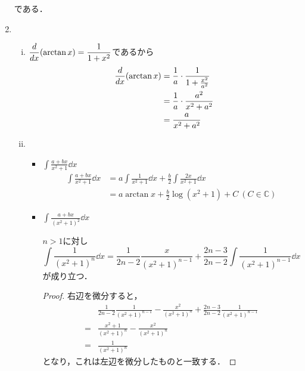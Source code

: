 \begin{enumerate}[(1)]
    である．
    \item 
    \begin{enumerate}[(i)]
        \item $\displaystyle \dv{x}(\arctan x)=\dfrac{1}{1+x^2}$であるから
        \begin{align}
            \dv{x}(\arctan x)
            &=\frac{1}{a}\cdot\frac{1}{1+\frac{x^2}{a^2}}\\
            &=\frac{1}{a}\cdot\frac{a^2}{x^2+a^2}\\
            &=\frac{a}{x^2+a^2}
        \end{align}
        \item \ 
        \begin{itemize}
            \item $\displaystyle \int \frac{a+bx}{x^2+1}\dd{x}$
            \begin{align}
                \int \frac{a+bx}{x^2+1}\dd{x}
                &=a\int\frac{1}{x^2+1}\dd{x}+\frac{b}{2}\int\frac{2x}{x^2+1}\dd{x}\\
                &=a\arctan{x}+\frac{b}{2}\log(x^2+1)+C\ (C\in \mathbb{C})
            \end{align}
            \item $\displaystyle \int \frac{a+bx}{(x^2+1)^2}\dd{x}$
            \begin{lemma}
                $n>1$に対し
                \begin{equation}
                    \int \frac{1}{(x^2+1)^n}\dd{x}=
                    \frac{1}{2n-2}\frac{x}{(x^2+1)^{n-1}}+
                    \frac{2n-3}{2n-2}\int \frac{1}{(x^2+1)^{n-1}}\dd{x}
                \end{equation}
                が成り立つ．
            \end{lemma}
            \begin{proof}
                右辺を微分すると，
                \begin{align}
                    &
                    \frac{1}{2n-2}\frac{1}{(x^2+1)^{n-1}}
                    -\frac{x^2}{(x^2+1)^{n}}+
                    \frac{2n-3}{2n-2}\frac{1}{(x^2+1)^{n-1}}\\
                    =&
                    \frac{x^2+1}{(x^2+1)^{n}}
                    -\frac{x^2}{(x^2+1)^{n}}\\
                    =&
                    \frac{1}{(x^2+1)^{n}}
                \end{align}
                となり，これは左辺を微分したものと一致する．
            \end{proof}

\end{itemize}
\end{enumerate}
\end{enumerate}
